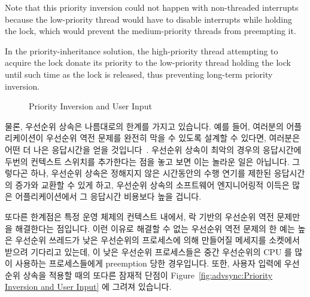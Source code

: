 Note that this priority inversion could not happen with non-threaded
interrupts because the low-priority thread would have to disable interrupts
while holding the lock, which would prevent the medium-priority
threads from preempting it.

In the priority-inheritance solution, the high-priority thread attempting
to acquire the lock donate its priority to the low-priority thread holding
the lock until such time as the lock is released, thus preventing long-term
priority inversion.
\fi

\begin{figure}[tb]
\centering
{}
\caption{Priority Inversion and User Input}
\end{figure}

물론, 우선순위 상속은 나름대로의 한계를 가지고 있습니다.
예를 들어, 여러분의 어플리케이션이 우선순위 역전 문제를 완전히 막을 수 있도록
설계할 수 있다면, 여러분은 어떤 더 나은 응답시간을 얻을
것입니다~\cite{VictorYodaiken2004a}.
우선순위 상속이 최악의 경우의 응답시간에 두번의 컨텍스트 스위치를 추가한다는
점을 놓고 보면 이는 놀라운 일은 아닙니다.
그렇다곤 하나, 우선순위 상속은 정해지지 않은 시간동안의 수행 연기를 제한된
응답시간의 증가와 교환할 수 있게 하고, 우선순위 상속의 소프트웨어 엔지니어링적
이득은 많은 어플리케이션에서 그 응답시간 비용보다 높을 겁니다.

또다른 한계점은 특정 운영 체제의 컨텍스트 내에서, 락 기반의 우선순위 역전
문제만을 해결한다는 점입니다.
이런 이유로 해결할 수 없는 우선순위 역전 문제의 한 예는 높은 우선순위 쓰레드가
낮은 우선순위의 프로세스에 의해 만들어질 메세지를 소켓에서 받으려 기다리고
있는데, 이 낮은 우선순위 프로세스들은 중간 우선순위의 CPU 를 많이 사용하는
프로세스들에게 preemption 당한  경우입니다.
또한, 사용자 입력에 우선순위 상속을 적용할 때의 또다른 잠재적 단점이
Figure~\ref{fig:advsync:Priority Inversion and User Input} 에 그려져 있습니다.
\iffalse

